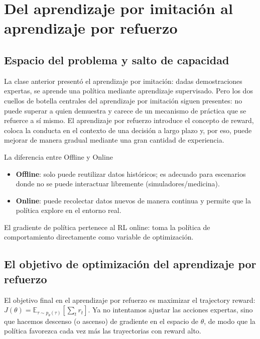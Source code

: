 \section{Del aprendizaje por imitación al aprendizaje por refuerzo}

\subsection{Espacio del problema y salto de capacidad}

La clase anterior presentó el aprendizaje por imitación: dadas demostraciones expertas, se aprende una política mediante aprendizaje supervisado. Pero los dos cuellos de botella centrales del aprendizaje por imitación siguen presentes: no puede superar a quien demuestra y carece de un mecanismo de práctica que se refuerce a sí mismo. El aprendizaje por refuerzo introduce el concepto de reward, coloca la conducta en el contexto de una decisión a largo plazo y, por eso, puede mejorar de manera gradual mediante una gran cantidad de experiencia.

\begin{knowledgebox}{La diferencia entre Offline y Online}
\begin{itemize}
    \item \textbf{Offline}: solo puede reutilizar datos históricos; es adecuado para escenarios donde no se puede interactuar libremente (simuladores/medicina).
    \item \textbf{Online}: puede recolectar datos nuevos de manera continua y permite que la política explore en el entorno real.
\end{itemize}
El gradiente de política pertenece al RL online: toma la política de comportamiento directamente como variable de optimización.
\end{knowledgebox}

\subsection{El objetivo de optimización del aprendizaje por refuerzo}

El objetivo final en el aprendizaje por refuerzo es maximizar el trajectory reward: $J(\theta) = \mathbb{E}_{\tau \sim p_\theta(\tau)} [\sum_t r_t]$. Ya no intentamos ajustar las acciones expertas, sino que hacemos descenso (o ascenso) de gradiente en el espacio de $\theta$, de modo que la política favorezca cada vez más las trayectorias con reward alto.

